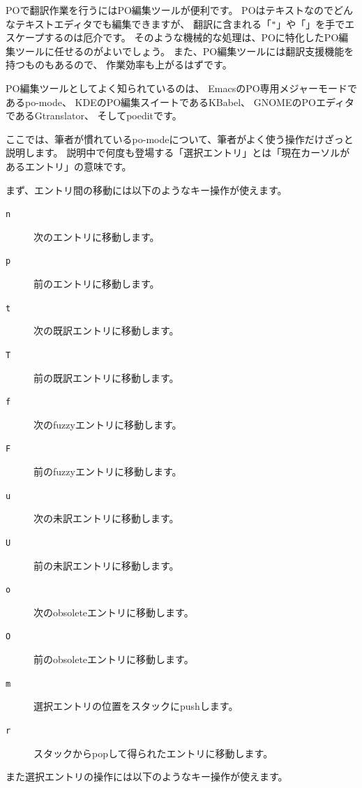 \documentclass[mingoth,a4paper]{jsarticle}
\begin{document}
POで翻訳作業を行うにはPO編集ツールが便利です。
POはテキストなのでどんなテキストエディタでも編集できますが、
翻訳に含まれる「\texttt{"}」や「\verb@\@」を手でエスケープするのは厄介です。%
そのような機械的な処理は、POに特化したPO編集ツールに任せるのがよいでしょう。
また、PO編集ツールには翻訳支援機能を持つものもあるので、
作業効率も上がるはずです。

PO編集ツールとしてよく知られているのは、
EmacsのPO専用メジャーモードであるpo-mode、
KDEのPO編集スイートであるKBabel、
GNOMEのPOエディタであるGtranslator、
そしてpoeditです。

ここでは、筆者が慣れているpo-modeについて、筆者がよく使う操作だけざっと説明します。
説明中で何度も登場する「選択エントリ」とは「現在カーソルがあるエントリ」の意味です。

まず、エントリ間の移動には以下のようなキー操作が使えます。

\begin{description}
 \item[\texttt{n}] 次のエントリに移動します。
 \item[\texttt{p}] 前のエントリに移動します。
 \item[\texttt{t}] 次の既訳エントリに移動します。
 \item[\texttt{T}] 前の既訳エントリに移動します。
 \item[\texttt{f}] 次のfuzzyエントリに移動します。
 \item[\texttt{F}] 前のfuzzyエントリに移動します。
 \item[\texttt{u}] 次の未訳エントリに移動します。
 \item[\texttt{U}] 前の未訳エントリに移動します。
 \item[\texttt{o}] 次のobsoleteエントリに移動します。
 \item[\texttt{O}] 前のobsoleteエントリに移動します。
 \item[\texttt{m}] 選択エントリの位置をスタックにpushします。
 \item[\texttt{r}] スタックからpopして得られたエントリに移動します。
\end{description}

また選択エントリの操作には以下のようなキー操作が使えます。
\end{document}
